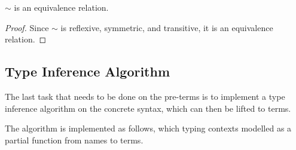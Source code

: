 \begin{theorem}
\(\sim\) is an equivalence relation.
\end{theorem}
\begin{proof}
Since \(\sim\) is reflexive, symmetric, and transitive, it is an equivalence relation.
\end{proof}

\subsection{Type Inference Algorithm}
The last task that needs to be done on the pre-terms is to implement a type inference algorithm on the concrete syntax, which can then be lifted to terms.

The algorithm is implemented as follows, which typing contexts modelled as a partial function from names to terms.

